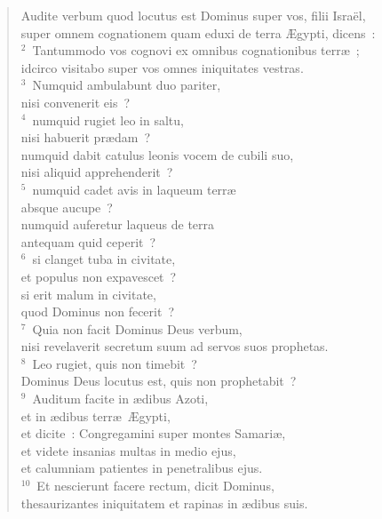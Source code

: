 \begin{flushleft}\begin{verse}\vspace{-19pt}Audite verbum quod locutus est Dominus super vos, filii Isra\"el,\\ super omnem cognationem quam eduxi de terra \AE gypti, dicens~:\\
${}^{2}$~Tantummodo vos cognovi ex omnibus cognationibus terr\ae~;\\ idcirco visitabo super vos omnes iniquitates vestras.\\
${}^{3}$~Numquid ambulabunt duo pariter,\\ nisi convenerit eis~?\\
${}^{4}$~numquid rugiet leo in saltu,\\ nisi habuerit pr\ae dam~?\\ numquid dabit catulus leonis vocem de cubili suo,\\ nisi aliquid apprehenderit~?\\
${}^{5}$~numquid cadet avis in laqueum terr\ae \\ absque aucupe~?\\ numquid auferetur laqueus de terra\\ antequam quid ceperit~?\\
${}^{6}$~si clanget tuba in civitate,\\ et populus non expavescet~?\\ si erit malum in civitate,\\ quod Dominus non fecerit~?\\
${}^{7}$~Quia non facit Dominus Deus verbum,\\ nisi revelaverit secretum suum ad servos suos prophetas.\\
${}^{8}$~Leo rugiet, quis non timebit~?\\ Dominus Deus locutus est, quis non prophetabit~?\\
${}^{9}$~Auditum facite in \ae dibus Azoti,\\ et in \ae dibus terr\ae\ \AE gypti,\\ et dicite~: Congregamini super montes Samari\ae ,\\ et videte insanias multas in medio ejus,\\ et calumniam patientes in penetralibus ejus.\\
${}^{10}$~Et nescierunt facere rectum, dicit Dominus,\\ thesaurizantes iniquitatem et rapinas in \ae dibus suis.\\

\end{verse}
\end{flushleft}

